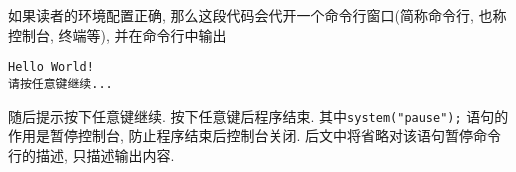         如果读者的环境配置正确, 那么这段代码会代开一个命令行窗口(简称命令行, 也称控制台, 终端等), 并在命令行中输出
\begin{lstlisting}
Hello World!
请按任意键继续...
\end{lstlisting}
        随后提示按下任意键继续. 按下任意键后程序结束. 其中\texttt{system("pause");} 语句的作用是暂停控制台, 防止程序结束后控制台关闭. 后文中将省略对该语句暂停命令行的描述, 只描述输出内容.